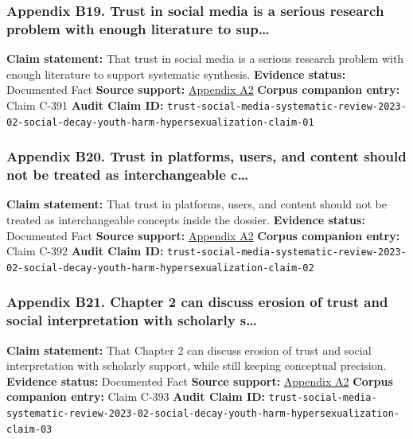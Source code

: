 \documentclass[
  american,
  11pt,
  letterpaper,
]{article}
\begin{document}
\subsubsection{Appendix B19. Trust in social media is a serious research
problem with enough literature to
sup\ldots{}}\label{appendix-b19-trust-in-social-media-is-a-serious-research-problem-with-enough-literature-to-sup}

\textbf{Claim statement:} That trust in social media is a serious
research problem with enough literature to support systematic synthesis.
\textbf{Evidence status:} Documented Fact \textbf{Source support:}
\hyperref[appendix-a2-what-do-we-mean-when-we-talk-about-trust-in-social-media-a-systematic-review]{Appendix
A2} \textbf{Corpus companion entry:} Claim C-391 \textbf{Audit Claim
ID:}
\texttt{trust-social-media-systematic-review-2023-02-social-decay-youth-harm-hypersexualization-claim-01}

\subsubsection{Appendix B20. Trust in platforms, users, and content
should not be treated as interchangeable
c\ldots{}}\label{appendix-b20-trust-in-platforms-users-and-content-should-not-be-treated-as-interchangeable-c}

\textbf{Claim statement:} That trust in platforms, users, and content
should not be treated as interchangeable concepts inside the dossier.
\textbf{Evidence status:} Documented Fact \textbf{Source support:}
\hyperref[appendix-a2-what-do-we-mean-when-we-talk-about-trust-in-social-media-a-systematic-review]{Appendix
A2} \textbf{Corpus companion entry:} Claim C-392 \textbf{Audit Claim
ID:}
\texttt{trust-social-media-systematic-review-2023-02-social-decay-youth-harm-hypersexualization-claim-02}

\subsubsection{Appendix B21. Chapter 2 can discuss erosion of trust and
social interpretation with scholarly
s\ldots{}}\label{appendix-b21-chapter-2-can-discuss-erosion-of-trust-and-social-interpretation-with-scholarly-s}

\textbf{Claim statement:} That Chapter 2 can discuss erosion of trust
and social interpretation with scholarly support, while still keeping
conceptual precision. \textbf{Evidence status:} Documented Fact
\textbf{Source support:}
\hyperref[appendix-a2-what-do-we-mean-when-we-talk-about-trust-in-social-media-a-systematic-review]{Appendix
A2} \textbf{Corpus companion entry:} Claim C-393 \textbf{Audit Claim
ID:}
\texttt{trust-social-media-systematic-review-2023-02-social-decay-youth-harm-hypersexualization-claim-03}
\end{document}

